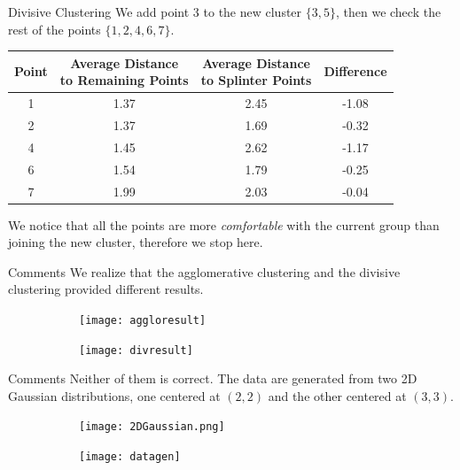 \documentclass{beamer}
\begin{document}
	\begin{frame}{Divisive Clustering}
		We add point 3 to the new cluster $\{3, 5\}$, then we check the rest of the points $\{1,2,4,6,7\}$.
		\begin{table}[htbp]
			\begin{tabular}{cccc}
				\toprule
				Point & \makecell{Average Distance \\ to Remaining Points} & \makecell{Average Distance \\ to Splinter Points} & Difference\\
				\midrule
				1& 1.37 & 2.45 & -1.08\\
				2& 1.37 & 1.69 & -0.32\\
				4& 1.45& 2.62 & -1.17\\
				6& 1.54 & 1.79 & -0.25\\
				7& 1.99&  2.03 & -0.04\\
				\bottomrule
			\end{tabular}
		\end{table}
		We notice that all the points are more \emph{comfortable} with the current group than joining the new cluster, therefore we stop here.
	\end{frame}
	
	\begin{frame}{Comments}
		We realize that the agglomerative clustering and the divisive clustering provided different results.
		\begin{figure}[htbp]
			\begin{subfigure}[b]{0.45\columnwidth}
				\centering
				\texttt{[image: aggloresult]}
			\end{subfigure}
			\hfill
			\begin{subfigure}[b]{0.45\columnwidth}
				\centering
				\texttt{[image: divresult]}
			\end{subfigure}
		\end{figure}
	\end{frame}
	
	\begin{frame}{Comments}
		Neither of them is correct. The data are generated from two 2D Gaussian distributions, one centered at $(2,2)$ and the other centered at $(3,3)$.
		\begin{figure}[htbp]
			\begin{subfigure}{0.48\columnwidth}
				\centering
				\texttt{[image: 2DGaussian.png]}
			\end{subfigure}
			\hfill
			\begin{subfigure}{0.48\columnwidth}
				\centering
				\texttt{[image: datagen]}
			\end{subfigure}
		\end{figure}
	\end{frame}
	
\end{document}
